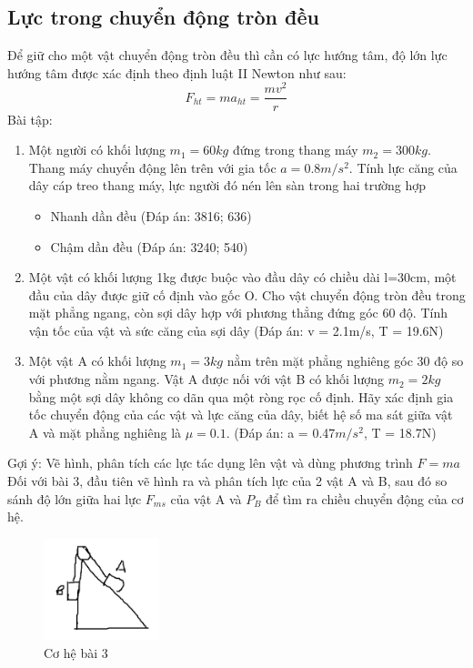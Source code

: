 \subsection{Lực trong chuyển động tròn đều}
Để giữ cho một vật chuyển động tròn đều thì cần có lực hướng tâm, độ lớn lực hướng tâm được xác định theo định luật II Newton như sau:
\begin{equation}
    F_{ht}=ma_{ht}=\frac{mv^2}{r}
\end{equation}
Bài tập:
\begin{enumerate}
    \item Một người có khối lượng $m_{1}=60kg$ đứng trong thang máy $m_{2}=300kg$. Thang máy chuyển động lên trên với gia tốc $a=0.8 m/s^2$. Tính lực căng của dây cáp treo thang máy, lực người đó nén lên sàn trong hai trường hợp
    \begin{itemize}
        \item Nhanh dần đều (Đáp án: 3816; 636)
        \item Chậm dần đều (Đáp án: 3240; 540)
    \end{itemize}
    \item Một vật có khối lượng 1kg được buộc vào đầu dây có chiều dài l=30cm, một đầu của dây được giữ cố định vào gốc O. Cho vật chuyển động tròn đều trong mặt phẳng ngang, còn sợi dây hợp với phương thẳng đứng góc 60 độ. Tính vận tốc của vật và sức căng của sợi dây (Đáp án: v = 2.1m/s, T = 19.6N)
    \item Một vật A có khối lượng $m_{1}=3kg$ nằm trên mặt phẳng nghiêng góc 30 độ so với phương nằm ngang. Vật A được nối với vật B có khối lượng $m_{2}=2kg$ bằng một sợi dây không co dãn qua một ròng rọc cố định. Hãy xác định gia tốc chuyển động của các vật và lực căng của dây, biết hệ số ma sát giữa vật A và mặt phẳng nghiêng là $\mu=0.1$. (Đáp án: a = 0.47$m/s^2$, T = 18.7N)
\end{enumerate}
Gợi ý: Vẽ hình, phân tích các lực tác dụng lên vật và dùng phương trình $F=ma$\\
Đối với bài 3, đầu tiên vẽ hình ra và phân tích lực của 2 vật A và B, sau đó so sánh độ lớn giữa hai lực $F_{ms}$ của vật A và $P_{B}$ để tìm ra chiều chuyển động của cơ hệ.
\begin{figure}
    \centering
    \includegraphics[width=0.3\textwidth]{co_he.png}
    \caption{Cơ hệ bài 3}
    \label{co_he}
\end{figure}
